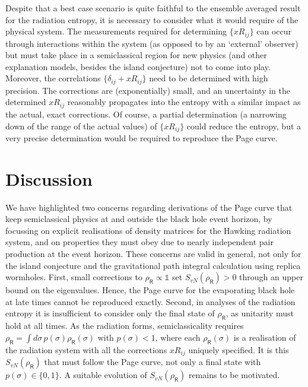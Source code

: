 \documentclass[12pt]{article}
\numberwithin{equation}{section}
\begin{document}
Despite that a best case scenario is quite faithful to the ensemble averaged result for the radiation entropy, it is necessary to consider what it would require of the physical system. The measurements required for determining $\{xR_{ij}\}$ can occur through interactions within the system (as opposed to by an `external' observer) but must take place in a semiclassical region for new physics (and other explanation models, besides the island conjecture) not to come into play. Moreover, the correlations $\{\delta_{ij}+xR_{ij}\}$ need to be determined with high precision. The corrections are (exponentially) small, and an uncertainty in the determined $xR_{ij}$ reasonably propagates into the entropy with a similar impact as the actual, exact corrections. Of course, a partial determination (a narrowing down of the range of the actual values) of $\{xR_{ij}\}$ could reduce the entropy, but a very precise determination would be required to reproduce the Page curve.

\section{Discussion}\label{s.disc}
We have highlighted two concerns regarding derivations of the Page curve that keep semiclassical physics at and outside the black hole event horizon, by focussing on explicit realisations of density matrices for the Hawking radiation system, and on properties they must obey due to nearly independent pair production at the event horizon. These concerns are valid in general, not only for the island conjecture and the gravitational path integral calculation using replica wormholes. First, small corrections to $\rho_\textsf{R}\propto\mathbb{1}$ set $S_{vN}(\rho_\textsf{R})>0$ through an upper bound on the eigenvalues. Hence, the Page curve for the evaporating black hole at late times cannot be reproduced exactly. Second, in analyses of the radiation entropy it is insufficient to consider only the final state of $\rho_\textsf{R}$, as unitarity must hold at all times. As the radiation forms, semiclassicality requires $\rho_\textsf{R}=\int d\sigma\, p(\sigma)\rho_\textsf{R}(\sigma)$ with $p(\sigma)<1$, where each $\rho_\textsf{R}(\sigma)$ is a realisation of the radiation system with all the corrections $xR_{ij}$ uniquely specified. It is this $S_{vN}(\rho_\textsf{R})$ that must follow the Page curve, not only a final state with $p(\sigma)\in\{0,1\}$. A suitable evolution of $S_{vN}(\rho_\textsf{R})$ remains to be motivated.
\end{document}
